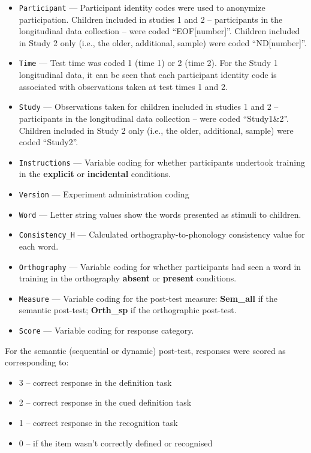 \documentclass[
  letterpaper,
  DIV=11,
  numbers=noendperiod]{scrreprt}
\providecommand{\tightlist}{%
  \setlength{\itemsep}{0pt}\setlength{\parskip}{0pt}}\usepackage{longtable,booktabs,array}
\begin{document}
\begin{itemize}
\tightlist
\item
  \texttt{Participant} --- Participant identity codes were used to
  anonymize participation. Children included in studies 1 and 2 --
  participants in the longitudinal data collection -- were coded
  ``EOF{[}number{]}''. Children included in Study 2 only (i.e., the
  older, additional, sample) were coded ``ND{[}number{]}''.
\item
  \texttt{Time} --- Test time was coded 1 (time 1) or 2 (time 2). For
  the Study 1 longitudinal data, it can be seen that each participant
  identity code is associated with observations taken at test times 1
  and 2.
\item
  \texttt{Study} --- Observations taken for children included in studies
  1 and 2 -- participants in the longitudinal data collection -- were
  coded ``Study1\&2''. Children included in Study 2 only (i.e., the
  older, additional, sample) were coded ``Study2''.
\item
  \texttt{Instructions} --- Variable coding for whether participants
  undertook training in the \textbf{explicit} or \textbf{incidental}
  conditions.
\item
  \texttt{Version} --- Experiment administration coding
\item
  \texttt{Word} --- Letter string values show the words presented as
  stimuli to children.
\item
  \texttt{Consistency\_H} --- Calculated orthography-to-phonology
  consistency value for each word.
\item
  \texttt{Orthography} --- Variable coding for whether participants had
  seen a word in training in the orthography \textbf{absent} or
  \textbf{present} conditions.
\item
  \texttt{Measure} --- Variable coding for the post-test measure:
  \textbf{Sem\_all} if the semantic post-test; \textbf{Orth\_sp} if the
  orthographic post-test.
\item
  \texttt{Score} --- Variable coding for response category.
\end{itemize}

For the semantic (sequential or dynamic) post-test, responses were
scored as corresponding to:

\begin{itemize}
\tightlist
\item
  3 -- correct response in the definition task
\item
  2 -- correct response in the cued definition task
\item
  1 -- correct response in the recognition task
\item
  0 -- if the item wasn't correctly defined or recognised
\end{itemize}
\end{document}

